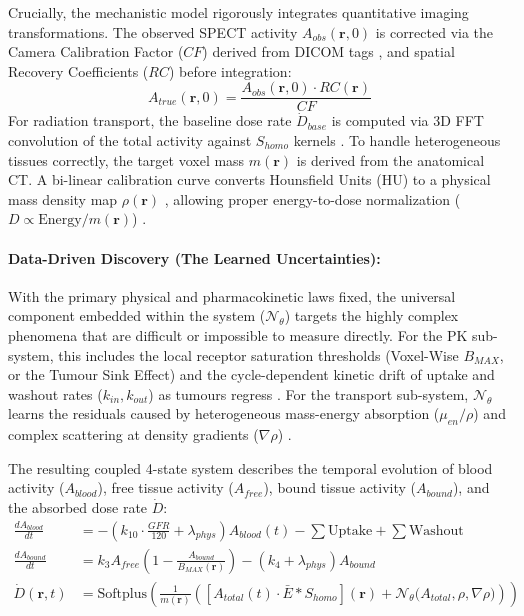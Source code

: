 \documentclass[10pt,letterpaper]{article}
\begin{document}
Crucially, the mechanistic model rigorously integrates quantitative imaging transformations. The observed SPECT activity $A_{obs}(\mathbf{r}, 0)$ is corrected via the Camera Calibration Factor ($CF$) derived from DICOM tags \cite{BidgoodHorii1992, GleisnerChouin2022}, and spatial Recovery Coefficients ($RC$) \cite{KlettingSchimmel2015} before integration:
\begin{equation}
    A_{true}(\mathbf{r}, 0) = \frac{A_{obs}(\mathbf{r}, 0) \cdot RC(\mathbf{r})}{CF}
\end{equation}
For radiation transport, the baseline dose rate $\dot{D}_{base}$ is computed via 3D FFT convolution of the total activity against $S_{homo}$ kernels \cite{PistoneAuditore2022}. To handle heterogeneous tissues correctly, the target voxel mass $m(\mathbf{r})$ is derived from the anatomical CT. A bi-linear calibration curve converts Hounsfield Units (HU) to a physical mass density map $\rho(\mathbf{r})$ \cite{GtzSchmidkonz2019}, allowing proper energy-to-dose normalization ($D \propto \text{Energy} / m(\mathbf{r})$) \cite{StabinMadsen2019, BaileyMarquis2022}.

\paragraph{Data-Driven Discovery (The Learned Uncertainties):}
With the primary physical and pharmacokinetic laws fixed, the universal component embedded within the system ($\mathcal{N}_\theta$) targets the highly complex phenomena that are difficult or impossible to measure directly. For the PK sub-system, this includes the local receptor saturation thresholds (Voxel-Wise $B_{MAX}$, or the Tumour Sink Effect) \cite{BegumThieme2018} and the cycle-dependent kinetic drift of uptake and washout rates ($k_{in}, k_{out}$) as tumours regress \cite{OkamotoThieme2016, SiebingaVeen2024, SiebingaPriv2023}. For the transport sub-system, $\mathcal{N}_\theta$ learns the residuals caused by heterogeneous mass-energy absorption ($\mu_{en}/\rho$) and complex scattering at density gradients ($\nabla \rho$) \cite{MikellKappadath2016, BaileyMarquis2022}.

The resulting coupled 4-state system describes the temporal evolution of blood activity ($A_{blood}$), free tissue activity ($A_{free}$), bound tissue activity ($A_{bound}$), and the absorbed dose rate $\dot{D}$:
\begin{align}
    \frac{dA_{blood}}{dt} &= -\left(k_{10} \cdot \frac{GFR}{120} + \lambda_{phys} \right) A_{blood}(t) - \sum \text{Uptake} + \sum \text{Washout} \\
    \frac{dA_{bound}}{dt} &= k_3 A_{free} \left( 1 - \frac{A_{bound}}{B_{MAX}(\mathbf{r})} \right) - (k_4 + \lambda_{phys}) A_{bound} \\
    \dot{D}(\mathbf{r}, t) &= \text{Softplus} \left( \frac{1}{m(\mathbf{r})} \left( \left[ A_{total}(t) \cdot \bar{E} \ast S_{homo} \right](\mathbf{r}) + \mathcal{N}_\theta \Big( A_{total}, \rho, \nabla \rho \Big) \right) \right)
\end{align}
\end{document}
